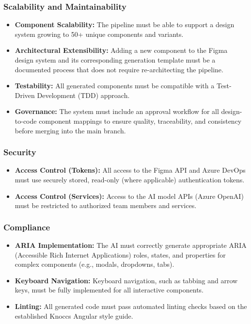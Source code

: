 \subsubsection{Scalability and Maintainability}
\begin{itemize}
    \item \textbf{Component Scalability:} The pipeline must be able to support a design system growing to 50+ unique components and variants.
    \item \textbf{Architectural Extensibility:} Adding a new component to the Figma design system and its corresponding generation template must be a documented process that does not require re-architecting the pipeline.
    \item \textbf{Testability:} All generated components must be compatible with a Test-Driven Development (TDD) approach.
    \item \textbf{Governance:} The system must include an approval workflow for all design-to-code component mappings to ensure quality, traceability, and consistency before merging into the main branch.
\end{itemize}

\subsubsection{Security}
\begin{itemize}
    \item \textbf{Access Control (Tokens):} All access to the Figma API and Azure DevOps must use securely stored, read-only (where applicable) authentication tokens.
    \item \textbf{Access Control (Services):} Access to the AI model APIs (Azure OpenAI) must be restricted to authorized team members and services.
\end{itemize}

\subsubsection{Compliance}
\begin{itemize}
    \item \textbf{ARIA Implementation:} The AI must correctly generate appropriate ARIA (Accessible Rich Internet Applications) roles, states, and properties for complex components (e.g., modals, dropdowns, tabs).
    \item \textbf{Keyboard Navigation:} Keyboard navigation, such as tabbing and arrow keys, must be fully implemented for all interactive components.
    \item \textbf{Linting:} All generated code must pass automated linting checks based on the established Knoccs Angular style guide.
\end{itemize}

